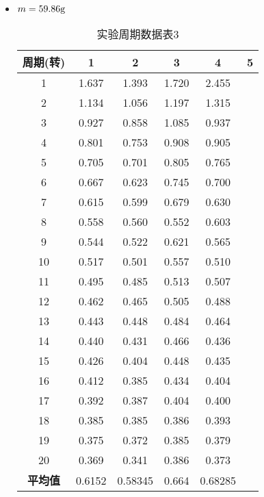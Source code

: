 \documentclass[12pt,hyperref,a4paper,UTF8]{ctexart}
\begin{document}
\begin{itemize}
            \item $m=59.86\text g$
                \begin{table}[h!]
                    \centering
                    \begin{tabular}{cccccc}
                    \toprule
                    \textbf{周期(转)} & \textbf{1} & \textbf{2} & \textbf{3} & \textbf{4} & \textbf{5} \\
                    \midrule
                    1  & 1.637 & 1.393 & 1.720 & 2.455 \\
                    2  & 1.134 & 1.056 & 1.197 & 1.315 \\
                    3  & 0.927 & 0.858 & 1.085 & 0.937 \\
                    4  & 0.801 & 0.753 & 0.908 & 0.905 \\
                    5  & 0.705 & 0.701 & 0.805 & 0.765 \\
                    6  & 0.667 & 0.623 & 0.745 & 0.700 \\
                    7  & 0.615 & 0.599 & 0.679 & 0.630 \\
                    8  & 0.558 & 0.560 & 0.552 & 0.603 \\
                    9  & 0.544 & 0.522 & 0.621 & 0.565 \\
                    10 & 0.517 & 0.501 & 0.557 & 0.510 \\
                    11 & 0.495 & 0.485 & 0.513 & 0.507 \\
                    12 & 0.462 & 0.465 & 0.505 & 0.488 \\
                    13 & 0.443 & 0.448 & 0.484 & 0.464 \\
                    14 & 0.440 & 0.431 & 0.466 & 0.436 \\
                    15 & 0.426 & 0.404 & 0.448 & 0.435 \\
                    16 & 0.412 & 0.385 & 0.434 & 0.404 \\
                    17 & 0.392 & 0.387 & 0.404 & 0.400 \\
                    18 & 0.385 & 0.385 & 0.386 & 0.393 \\
                    19 & 0.375 & 0.372 & 0.385 & 0.379 \\
                    20 & 0.369 & 0.341 & 0.386 & 0.373 \\
                    \midrule
                    \textbf{平均值} & 0.6152 & 0.58345 & 0.664 & 0.68285 \\
                    \bottomrule
                    \end{tabular}
                    \caption{实验周期数据表3}
                    \end{table}


\end{itemize}
\end{document}
